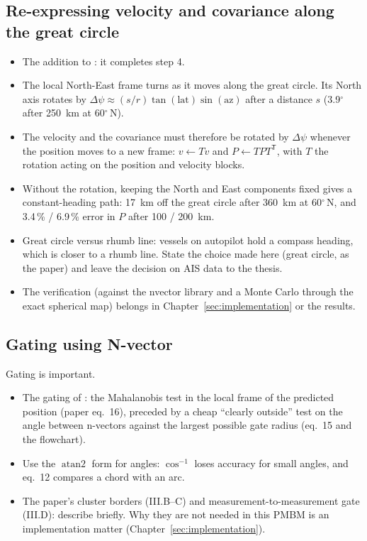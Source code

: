 \subsection{Re-expressing velocity and covariance along the great circle}
\label{sec:nvector-transport}
\begin{itemize}
    \item The addition to \cite{b_gade_2024}: it completes step 4.
    \item The local North-East frame turns as it moves along the great circle. Its North axis rotates by $\Delta\psi \approx (s/r)\tan(\text{lat})\sin(\text{az})$ after a distance $s$ (3.9$^\circ$ after 250~km at 60$^\circ$\,N).
    \item The velocity and the covariance must therefore be rotated by $\Delta\psi$ whenever the position moves to a new frame: $v \leftarrow T v$ and $P \leftarrow T P T^{\mathsf{T}}$, with $T$ the rotation acting on the position and velocity blocks.
    \item Without the rotation, keeping the North and East components fixed gives a constant-heading path: 17~km off the great circle after 360~km at 60$^\circ$\,N, and 3.4\,\% / 6.9\,\% error in $P$ after 100 / 200~km.
    \item Great circle versus rhumb line: vessels on autopilot hold a compass heading, which is closer to a rhumb line. State the choice made here (great circle, as the paper) and leave the decision on AIS data to the thesis.
    \item The verification (against the nvector library and a Monte Carlo through the exact spherical map) belongs in Chapter~\ref{sec:implementation} or the results.
\end{itemize}

\subsection{Gating using N-vector}
Gating is important.
\begin{itemize}
    \item The gating of \cite[Sec.~III]{b_gade_2024}: the Mahalanobis test in the local frame of the predicted position (paper eq.~16), preceded by a cheap ``clearly outside'' test on the angle between n-vectors against the largest possible gate radius (eq.~15 and the flowchart).
    \item Use the $\operatorname{atan2}$ form for angles: $\cos^{-1}$ loses accuracy for small angles, and eq.~12 compares a chord with an arc.
    \item The paper's cluster borders (III.B--C) and measurement-to-measurement gate (III.D): describe briefly. Why they are not needed in this PMBM is an implementation matter (Chapter~\ref{sec:implementation}).
\end{itemize}

